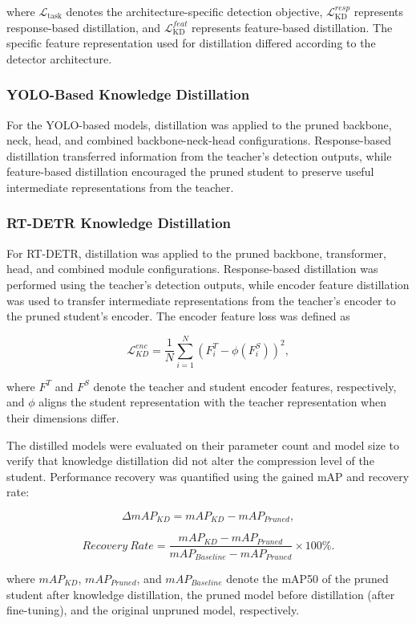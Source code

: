 where $\mathcal{L}_{\mathrm{task}}$ denotes the architecture-specific detection objective, $\mathcal{L}_{\mathrm{KD}}^{resp}$ represents response-based distillation, and $\mathcal{L}_{\mathrm{KD}}^{feat}$ represents feature-based distillation. The specific feature representation used for distillation differed according to the detector architecture.

\subsubsection{YOLO-Based Knowledge Distillation}

For the YOLO-based models, distillation was applied to the pruned backbone, neck, head, and combined backbone-neck-head configurations. Response-based distillation transferred information from the teacher's detection outputs, while feature-based distillation encouraged the pruned student to preserve useful intermediate representations from the teacher.

\subsubsection{RT-DETR Knowledge Distillation}

For RT-DETR, distillation was applied to the pruned backbone, transformer, head, and combined module configurations. Response-based distillation was performed using the teacher's detection outputs, while encoder feature distillation was used to transfer intermediate representations from the teacher's encoder to the pruned student's encoder. The encoder feature loss was defined as

$$
\mathcal{L}_{KD}^{enc}
=
\frac{1}{N}
\sum_{i=1}^{N}
\left(F_i^{T}-\phi(F_i^{S})\right)^2,
$$

where $F^{T}$ and $F^{S}$ denote the teacher and student encoder features, respectively, and $\phi$ aligns the student representation with the teacher representation when their dimensions differ.

The distilled models were evaluated on their parameter count and model size to verify that knowledge distillation did not alter the compression level of the student. Performance recovery was quantified using the gained mAP and recovery rate:

$$
\Delta mAP_{KD}
=
mAP_{KD}-mAP_{Pruned},
$$

$$
Recovery\ Rate
=
\frac{
mAP_{KD}-mAP_{Pruned}
}{
mAP_{Baseline}-mAP_{Pruned}
}
\times100\%.
$$

where $mAP_{KD}$, $mAP_{Pruned}$, and $mAP_{Baseline}$ denote the mAP50 of the pruned student after knowledge distillation, the pruned model before distillation (after fine-tuning), and the original unpruned model, respectively.


